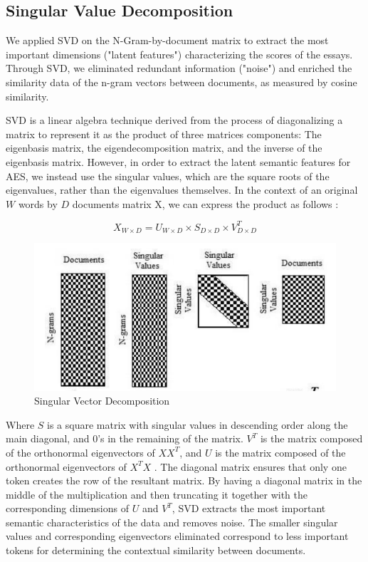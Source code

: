 \documentclass[10pt,letterpaper]{article}
\begin{document}
\subsection{Singular Value Decomposition}

We applied SVD on the N-Gram-by-document matrix to extract the most important dimensions ("latent features") characterizing the scores of the essays. Through SVD, we eliminated redundant information ("noise") and enriched the similarity data of the n-gram vectors between documents, as measured by cosine similarity. 

SVD is a linear algebra technique derived from the process of diagonalizing a matrix to represent it as the product of three matrices components: The eigenbasis matrix, the eigendecomposition matrix, and the inverse of the eigenbasis matrix. However, in order to extract the latent semantic features for AES, we instead use the singular values, which are the square roots of the eigenvalues, rather than the eigenvalues themselves. In the context of an original $W$ words by $D$ documents matrix X, we can express the product as follows \cite{islam2010automated}: 

$$X_{W\times D} = U_{W\times D} \times S_{D \times D} \times V^{T}_{D \times D}$$

\begin{figure}[ht]
\begin{center}
\includegraphics[scale=0.65]{img/SVD.png}
\end{center}
\caption{Singular Vector Decomposition \cite{islam2010automated}} 
\end{figure}


Where $S$ is a square matrix with singular values in descending order along the main diagonal, and 0's in the remaining of the matrix. $V^T$ is the matrix composed of the orthonormal eigenvectors of $XX^T$, and $U$ is the matrix composed of the orthonormal eigenvectors of $X^TX$ \cite{islam2010automated}. The diagonal matrix ensures that only one token creates the row of the resultant matrix. By having a diagonal matrix in the middle of the multiplication and then truncating it together with the corresponding dimensions of $U$ and $V^T$, SVD extracts the most important semantic characteristics of the data and removes noise. The smaller singular values and corresponding eigenvectors eliminated correspond to less important tokens for determining the contextual similarity between documents. 
\end{document}

